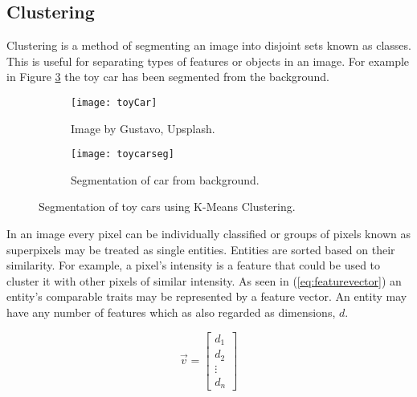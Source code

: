 \subsection{Clustering}
Clustering is a method of segmenting an image into disjoint sets known as classes. This is useful for separating types of features or objects in an image. For example in Figure \ref{fig:toycar} the toy car has been segmented from the background.

\begin{figure}[H]
	\centering
	\begin{subfigure}[b]{0.5\linewidth}
      		\centering\texttt{[image: toyCar]}
      		\caption{Image by Gustavo, Upsplash.}
		    \label{fig:toycarA}
    	\end{subfigure}%
    	\begin{subfigure}[b]{0.5\linewidth}
      		\centering\texttt{[image: toycarseg]}
      		\caption{Segmentation of car from background.}
       		\label{fig:toycarB}
    	\end{subfigure}
    	\caption{Segmentation of toy cars using K-Means Clustering.}
    	\label{fig:toycar}
\end{figure} 

In an image every pixel can be individually classified or groups of pixels known as superpixels may be treated as single entities. Entities are sorted based on their similarity. For example, a pixel's intensity is a feature that could be used to cluster it with other pixels of similar intensity. As seen in (\ref{eq:featurevector}) an entity's comparable traits may be represented by a feature vector. An entity may have any number of features which as also regarded as dimensions, $d$. 

\begin{equation}
    \vec{v} = 
    \begin{bmatrix}
        d_1 \\
        d_2 \\
        \vdots \\ 
        d_n
    \end{bmatrix}
    \label{eq:featurevector}
\end{equation}





